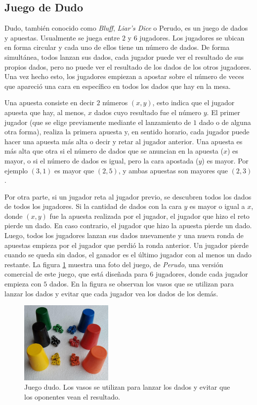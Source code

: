 \subsection*{Juego de Dudo}
Dudo, también conocido como \textit{Bluff}, \textit{Liar's Dice} o Perudo, es un juego de dados y apuestas. Usualmente se juega entre $2$ y $6$ jugadores. Los jugadores se ubican en forma circular y cada uno de ellos tiene un número de dados. De forma simultánea, todos lanzan sus dados, cada jugador puede ver el resultado de sus propios dados, pero no puede ver el resultado de los dados de los otros jugadores. Una vez hecho esto, los jugadores empiezan a apostar sobre el número de veces que apareció una cara en específico en todos los dados que hay en la mesa.

Una apuesta consiste en decir $2$ números $(x, y)$, esto indica que el jugador apuesta que hay, al menos, $x$ dados cuyo resultado fue el número $y$. El primer jugador (que se elige previamente mediante el lanzamiento de $1$ dado o de alguna otra forma), realiza la primera apuesta y, en sentido horario, cada jugador puede hacer una apuesta más alta o decir  y retar al jugador anterior. Una apuesta es más alta que otra si el número de dados que se anuncian en la apuesta ($x$) es mayor, o si el número de dados es igual, pero la cara apostada ($y$) es mayor. Por ejemplo $(3, 1)$ es mayor que $(2, 5)$, y ambas apuestas son mayores que $(2, 3)$.

Por otra parte, si un jugador reta al jugador previo, se descubren todos los dados de todos los jugadores. Si la cantidad de dados con la cara $y$ es mayor o igual a $x$, donde $(x, y)$ fue la apuesta realizada por el jugador, el jugador que hizo el reto pierde un dado. En caso contrario, el jugador que hizo la apuesta pierde un dado. Luego, todos los jugadores lanzan sus dados nuevamente y una nueva ronda de apuestas empieza por el jugador que perdió la ronda anterior. Un jugador pierde cuando se queda sin dados, el ganador es el último jugador con al menos un dado restante. La figura \ref{fig:dudo} muestra una foto del juego, de \textit{Perudo}, una versión comercial de este juego, que está diseñada para $6$ jugadores, donde cada jugador empieza con $5$ dados. En la figura se observan los vasos que se utilizan para lanzar los dados y evitar que cada jugador vea los dados de los demás.

\begin{figure}[h]
    \centering
    \includegraphics[width=0.4\textwidth]{figuras/dudo.jpg}
    \caption{Juego dudo. Los vasos se utilizan para lanzar los dados y evitar que los oponentes vean el resultado.}
    \label{fig:dudo}
\end{figure}

